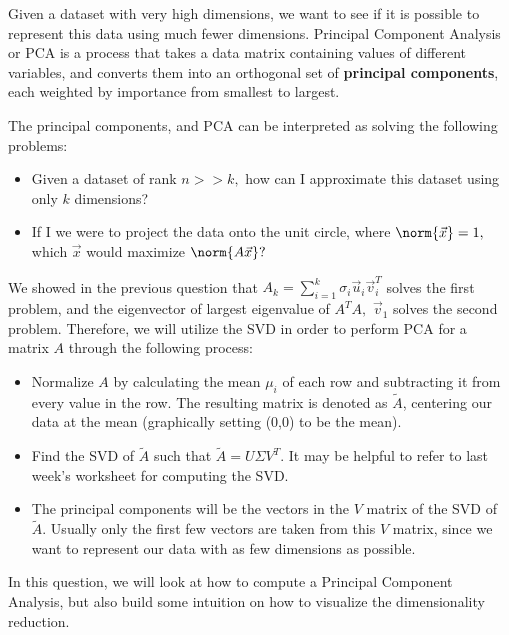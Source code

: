 

Given a dataset with very high dimensions, we want to see if it is possible to represent this data using much fewer dimensions. 
Principal Component Analysis or PCA is a process that takes a data matrix containing values of different variables, and converts them into an orthogonal set of \textbf{principal components}, each weighted by importance from smallest to largest.

The principal components, and PCA can be interpreted as solving the following problems:
\begin{itemize}
  \item Given a dataset of rank $n >> k,$ how can I approximate this dataset using only $k$ dimensions?
  \item If I we were to project the data onto the unit circle, where $\norm{\vec{x}} = 1,$ which $\vec{x}$ would maximize $\norm{A \vec{x}}?$
\end{itemize}

We showed in the previous question that $A_{k} = \sum\limits_{i = 1}^{k} \sigma_{i} \vec{u}_{i} \vec{v}_{i}^{T}$ solves the first problem, and the eigenvector of largest eigenvalue of $A^{T}A,$ $\vec{v}_{1}$ solves the second problem. Therefore, we will utilize the SVD in order to perform PCA for a matrix $A$ through the following process:
\begin{itemize}
  \item Normalize $A$ by calculating the mean $\mu_{i}$ of each row and subtracting it from every value in the row. The resulting matrix is denoted as $\tilde{A}$, centering our data at the mean (graphically setting (0,0) to be the mean).
  \item Find the SVD of $\tilde{A}$ such that $\tilde{A} = U \Sigma V^T$. It may be helpful to refer to last week's worksheet for computing the SVD.
  \item The principal components will be the vectors in the $V$ matrix of the SVD of $\tilde{A}.$ 
  Usually only the first few vectors are taken from this $V$ matrix, since we want to represent our data with as few dimensions as possible.
\end{itemize}

In this question, we will look at how to compute a Principal Component Analysis, but also build some intuition on how to visualize the dimensionality reduction.

